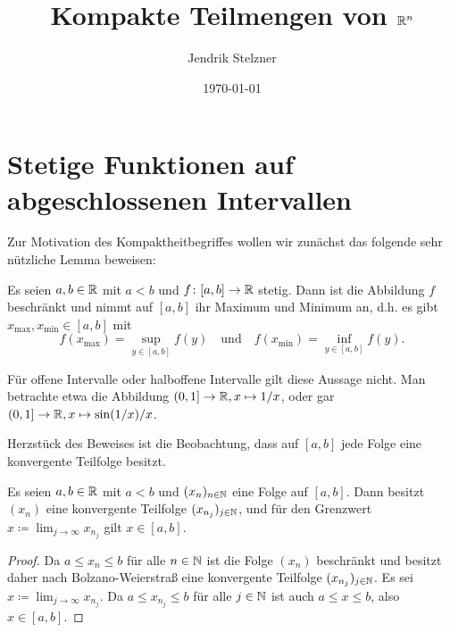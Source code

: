 \documentclass[a4paper,10pt]{article}
\title{Kompakte Teilmengen von $\mathbb{R}^n$}
\author{Jendrik Stelzner}
\date{\today}
\begin{document}
\maketitle


\section{Stetige Funktionen auf abgeschlossenen Intervallen}


Zur Motivation des Kompaktheitbegriffes wollen wir zunächst das folgende sehr nützliche Lemma beweisen:


\begin{lem}\label{lem: stetig auf Intervall}
 Es seien $a,b \in \mathbb{R}$ mit $a < b$ und $f \colon [a,b] \to \mathbb{R}$ stetig. Dann ist die Abbildung $f$ beschränkt und nimmt auf $[a,b]$ ihr Maximum und Minimum an, d.h. es gibt $x_{\text{max}}, x_{\text{min}} \in [a,b]$ mit
 \[
  f(x_{\text{max}}) = \sup_{y \in [a,b]} f(y)
  \quad
  \text{und}
  \quad
  f(x_{\text{min}}) = \inf_{y \in [a,b]} f(y).
 \]
\end{lem}


Für offene Intervalle oder halboffene Intervalle gilt diese Aussage nicht. Man betrachte etwa die Abbildung $(0,1] \to \mathbb{R}, x \mapsto 1/x$, oder gar $(0,1] \to \mathbb{R}, x \mapsto \sin(1/x)/x$.


Herzstück des Beweises ist die Beobachtung, dass auf $[a,b]$ jede Folge eine konvergente Teilfolge besitzt.


\begin{lem}\label{lem: Intervall ist kompakt}
 Es seien $a,b \in \mathbb{R}$ mit $a < b$ und $(x_n)_{n \in \mathbb{N}}$ eine Folge auf $[a,b]$. Dann besitzt $(x_n)$ eine konvergente Teilfolge $(x_{n_j})_{j \in \mathbb{N}}$, und für den Grenzwert $x \coloneqq \lim_{j \to \infty} x_{n_j}$ gilt $x \in [a,b]$.
\end{lem}
\begin{proof}
 Da $a \leq x_n \leq b$ für alle $n \in \mathbb{N}$ ist die Folge $(x_n)$ beschränkt und besitzt daher nach Bolzano-Weierstraß eine konvergente Teilfolge $(x_{n_j})_{j \in \mathbb{N}}$. Es sei $x \coloneqq \lim_{j \to \infty} x_{n_j}$. Da $a \leq x_{n_j} \leq b$ für alle $j \in \mathbb{N}$ ist auch $a \leq x \leq b$, also $x \in [a,b]$.
\end{proof}
\end{document}
